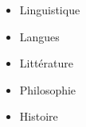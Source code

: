 

\begin{cventries}

  \begin{itemize}
    \item Linguistique
    \item Langues
    \item Littérature
    \item Philosophie
    \item Histoire
  \end{itemize}
\end{cventries}
